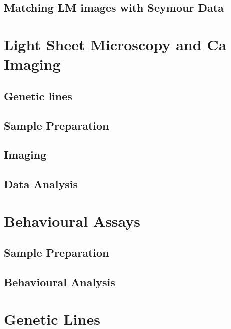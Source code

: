 \subsection{Matching LM images with Seymour Data} %


\section{Light Sheet Microscopy and Ca Imaging}
\subsection{Genetic lines} %
\subsection{Sample Preparation}
\subsection{Imaging}
\subsection{Data Analysis}

\newpage


\section{Behavioural Assays}
\subsection{Sample Preparation}
\subsection{Behavioural Analysis}


\section{Genetic Lines}








